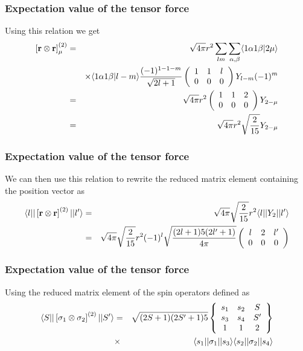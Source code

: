 \documentclass[compress]{beamer}
\newcommand*{\ket}[1]{|#1\rangle}
\newcommand*{\bra}[1]{\langle#1|}
\begin{document}
\frame
{
\frametitle{Expectation value of the tensor force}
\begin{small}
{\scriptsize
Using this relation we get  
\begin{eqnarray*}
\left[{\bf r} \otimes {\bf r} \right]^{(2)}_\mu &=& 
\sqrt{4\pi}r^2
\sum_{lm}
\sum_{\alpha ,\beta}   \bra{1\alpha 1\beta}2\mu \rangle \\
&&\times \bra{1\alpha 1\beta}l-m \rangle
\frac{(-1)^{1-1-m}}{\sqrt{2l+1}} 
\left(\begin{array}{ccc} 1&1&l \\ 0  &0  &0\end{array}\right)Y_{l-m}(-1)^m\\
&=& \sqrt{4\pi}r^2
\left(\begin{array}{ccc} 1&1&2 \\ 0  &0  &0\end{array}\right)
Y_{2-\mu}\\
&=& \sqrt{4\pi}r^2 \sqrt{\frac{2}{15}}Y_{2-\mu}
\end{eqnarray*}
}
\end{small}
}


\frame
{
\frametitle{Expectation value of the tensor force}
\begin{small}
{\scriptsize
We can then  use this relation to rewrite the reduced matrix element containing the 
position vector as  
\begin{eqnarray*}
\bra{l} |\left[{\bf r} \otimes {\bf r} \right]^{(2)} | \ket{l'}
& = & 
\sqrt{4\pi}\sqrt{ \frac{2}{15}}r^2 \bra{l} |Y_2 | \ket{l'} \\
& = &\sqrt{4\pi}\sqrt{ \frac{2}{15}}  r^2 (-1)^l
\sqrt{\frac{(2l+1)5(2l'+1)}{4\pi}}
\left(\begin{array}{ccc} l&2&l' \\ 0&0&0\end{array}\right)
\end{eqnarray*}
}
\end{small}
}


\frame
{
\frametitle{Expectation value of the tensor force}
\begin{small}
{\scriptsize
Using the  reduced matrix element of the spin 
operators defined as
\begin{eqnarray*}
\bra{S} |\left[{\bf \sigma}_1 \otimes {\bf \sigma}_2\right]^{(2)} | \ket{S'}
& = & 
\sqrt{(2S+1)(2S'+1)5}
\left\{\begin{array}{ccc} s_1&s_2&S \\s_3&s_4&S' \\ 1&1&2\end{array}\right\}\\
&\times& 
\bra{s_1} | {\bf \sigma}_1 | \ket{s_3}
\bra{s_2} | {\bf \sigma}_2 | \ket{s_4}
\end{eqnarray*}
}
\end{small}
}
\end{document}
